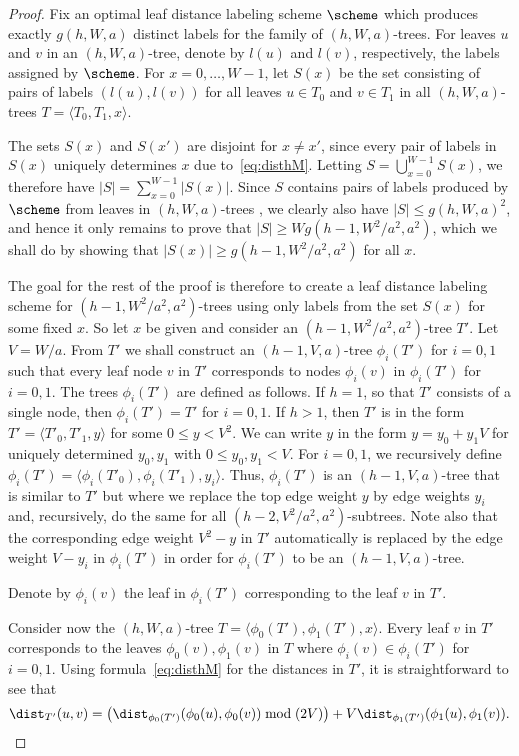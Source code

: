 \begin{proof}
Fix an optimal leaf distance labeling scheme $\scheme$ which produces exactly $g(h,W,a)$ distinct labels for the family of $(h,W,a)$-trees. For leaves $u$ and $v$ in an $(h,W,a)$-tree, denote by $l(u)$ and $l(v)$, respectively, the labels assigned by $\scheme$. For $x=0,\dots ,W-1$, let $S(x)$ be the set consisting of pairs of labels $(l(u),l(v))$ for all leaves $u\in T_0$ and $v\in T_1$ in all $(h,W,a)$-trees $T=\langle T_0,T_1,x\rangle$.

The sets $S(x)$ and $S(x')$ are disjoint for $x\neq x'$, since every pair of labels in $S(x)$ uniquely determines $x$ due to~\eqref{eq:disthM}. Letting $S=\bigcup_{x=0}^{W-1}S(x)$, we therefore have $|S|=\sum_{x=0}^{W-1}|S(x)|$. 
Since $S$ contains pairs of labels produced by $\scheme$ from leaves in $(h,W,a)$-trees , we clearly also have $|S|\leq g(h,W,a)^2$, and hence it only remains to prove that $|S|\geq Wg(h-1,W^2/a^2,a^2)$, which we shall do by showing that $|S(x)|\geq g(h-1,W^2/a^2,a^2)$ for all $x$.

The goal for the rest of the proof is therefore to create a leaf distance labeling scheme for $(h-1,W^2/a^2,a^2)$-trees using only labels from the set $S(x)$ for some fixed $x$. So let $x$ be given and consider an $(h-1,W^2/a^2,a^2)$-tree $T'$. Let  $V=W/a$. From $T'$ we shall construct an $(h-1,V,a)$-tree $\phi_i(T')$ for $i=0,1$ such that every leaf node $v$ in $T'$ corresponds to nodes $\phi_i(v)$ in $\phi_i(T')$ for $i=0,1$.
The trees $\phi_i(T')$ are defined as follows.
If $h=1$, so that $T'$ consists of a single node, then $\phi_i(T')=T'$ for $i=0,1$. 
If $h>1$, then $T'$ is in the form $T'=\langle T'_0,T'_1,y\rangle$ for some $0\leq y< V^2$. We can write $y$ in the form $y=y_0+y_1V$ for uniquely determined $y_0,y_1$ with $0\leq y_0,y_1<V$. For $i=0,1$, we recursively define $\phi_i(T') = \langle \phi_i(T'_0), \phi_i(T'_1),y_i\rangle$. Thus, $\phi_i(T')$ is an $(h-1,V,a)$-tree that is similar to $T'$ but where we replace the top edge weight $y$ by edge weights $y_i$ and, recursively, do the same for all $(h-2,V^2/a^2,a^2)$-subtrees. Note also that the corresponding edge weight $V^2-y$ in $T'$ automatically is replaced by the edge weight $V-y_i$ in $\phi_i(T')$ in order for $\phi_i(T')$ to be an $(h-1,V,a)$-tree.

Denote by $\phi_i(v)$ the leaf in $\phi_i(T')$ corresponding to the leaf $v$ in $T'$.

Consider now the $(h,W,a)$-tree $T=\langle \phi_0(T'),\phi_1(T'),x\rangle$. Every leaf $v$ in $T'$ corresponds to the leaves $\phi_0(v),\phi_1(v)$ in $T$ where $\phi_i(v)\in \phi_i(T')$ for $i=0,1$. 
Using  formula~\eqref{eq:disthM} for the distances in $T'$, it is straightforward to see that
\begin{equation*} \label{eq:disthMdistances}
\dist_{T'}(u,v) = \left(\dist_{\phi_0(T')}(\phi_0(u),\phi_0(v)) \bmod (2V)\right) + V\dist_{\phi_1(T')}(\phi_1(u),\phi_1(v)).
\end{equation*}


\end{proof}
